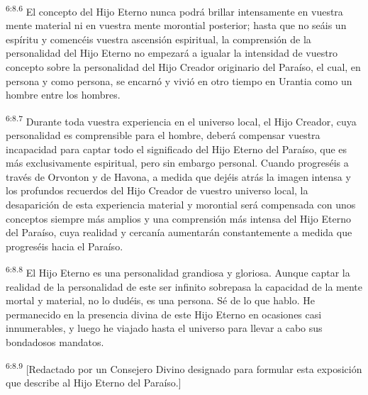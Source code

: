 \par
\textsuperscript{6:8.6} El concepto del Hijo Eterno nunca podrá brillar intensamente en vuestra mente material ni en vuestra mente morontial posterior; hasta que no seáis un espíritu y comencéis vuestra ascensión espiritual, la comprensión de la personalidad del Hijo Eterno no empezará a igualar la intensidad de vuestro concepto sobre la personalidad del Hijo Creador originario del Paraíso, el cual, en persona y como persona, se encarnó y vivió en otro tiempo en Urantia como un hombre entre los hombres.

\par
\textsuperscript{6:8.7} Durante toda vuestra experiencia en el universo local, el Hijo Creador, cuya personalidad es comprensible para el hombre, deberá compensar vuestra incapacidad para captar todo el significado del Hijo Eterno del Paraíso, que es más exclusivamente espiritual, pero sin embargo personal. Cuando progreséis a través de Orvonton y de Havona, a medida que dejéis atrás la imagen intensa y los profundos recuerdos del Hijo Creador de vuestro universo local, la desaparición de esta experiencia material y morontial será compensada con unos conceptos siempre más amplios y una comprensión más intensa del Hijo Eterno del Paraíso, cuya realidad y cercanía aumentarán constantemente a medida que progreséis hacia el Paraíso.

\par
\textsuperscript{6:8.8} El Hijo Eterno es una personalidad grandiosa y gloriosa. Aunque captar la realidad de la personalidad de este ser infinito sobrepasa la capacidad de la mente mortal y material, no lo dudéis, es una persona. Sé de lo que hablo. He permanecido en la presencia divina de este Hijo Eterno en ocasiones casi innumerables, y luego he viajado hasta el universo para llevar a cabo sus bondadosos mandatos.

\par
\textsuperscript{6:8.9} [Redactado por un Consejero Divino designado para formular esta exposición que describe al Hijo Eterno del Paraíso.]